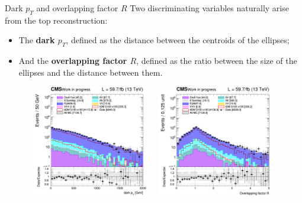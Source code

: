 \documentclass[8pt]{beamer}
\begin{document}
\begin{frame}{Dark $p_T$ and overlapping factor $R$}
\justifying
Two discriminating variables naturally arise from the top reconstruction:
\begin{itemize}
\item The \textbf{dark $p_T$}, defined as the distance between the centroids of the ellipses;
\item And the \textbf{overlapping factor $R$}, defined as the ratio between the size of the ellipses and the distance between them. 
\end{itemize} \vfill

\begin{figure}[htbp]
\centering
\begin{minipage}[b]{.49\textwidth}
\includegraphics[width=5.5cm, height=5cm]{figs/2018/SmearSR-ttDM-scalar100/log_cratio_topCR_ll_dark_pt.png}
\end{minipage}\hfill
\begin{minipage}[b]{.49\textwidth}
\includegraphics[width=5.5cm, height=5cm]{figs/2018/SmearSR-ttDM-scalar100/log_cratio_topCR_ll_overlapping_factor.png}
\end{minipage} \hfill
\label{fig:SRdiscmblt}
\end{figure}
\end{frame}
\end{document}
